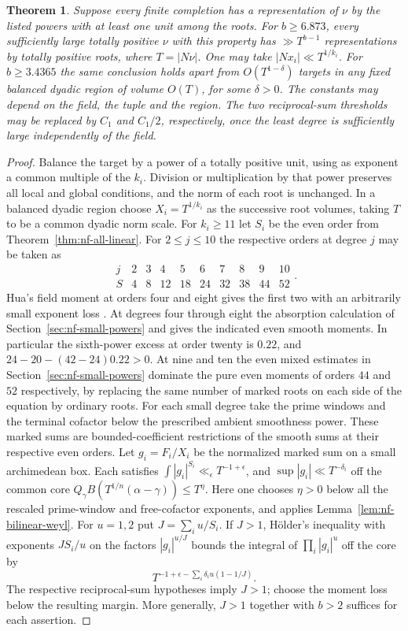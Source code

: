 \documentclass[11pt,letterpaper]{article}
\newtheorem{theorem}{Theorem}[section]
\theoremstyle{definition}
\numberwithin{equation}{section}
\begin{document}
\begin{theorem}\label{thm:nf-mixed}
Suppose every finite completion has a representation of $\nu$ by the
listed powers with at least one unit among the roots. For $b\ge6.873$,
every sufficiently large totally positive $\nu$ with this property
has $\gg T^{b-1}$ representations by totally positive roots,
where $T=|N\nu|$. One may take $|Nx_i|\ll T^{1/k_i}$.
For $b\ge3.4365$ the same conclusion holds apart from
$O(T^{1-\delta})$ targets in any fixed balanced dyadic region of
volume $O(T)$, for some $\delta>0$. The constants may depend on the
field, the tuple and the region. The two
reciprocal-sum thresholds may be replaced by $C_1$ and
$C_1/2$, respectively, once the least degree is sufficiently
large independently of the field.
\end{theorem}
\begin{proof}
Balance the target by a power of a totally positive unit, using as
exponent a common multiple of the $k_i$. Division or multiplication by
that power preserves all local and global conditions, and the norm of
each root is unchanged. In a balanced dyadic region choose $X_i=T^{1/k_i}$
as the successive root volumes, taking $T$ to be a common dyadic norm
scale. For $k_i\ge11$ let $S_i$ be the even order from
Theorem~\ref{thm:nf-all-linear}. For $2\le j\le10$ the respective
orders at degree $j$ may be taken as
\[
  \begin{array}{c|rrrrrrrrr}j&2&3&4&5&6&7&8&9&10\\\hline
                  S&4&8&12&18&24&32&38&44&52\end{array}.
\]
Hua's field moment at orders four and eight gives the first two
with an arbitrarily small exponent loss
\cite[\S3]{NFSmallSupplement}. At degrees four through eight
the absorption calculation of Section~\ref{sec:nf-small-powers}
and \cite[\S\S11--13]{NFSmallSupplement} gives the indicated even
smooth moments. In particular the sixth-power excess at order twenty
is $0.22$, and $24-20-(42-24)0.22>0$. At nine and ten the even
mixed estimates in Section~\ref{sec:nf-small-powers} dominate the
pure even moments of orders $44$ and $52$ respectively, by replacing
the same number of marked roots on each side of the equation by
ordinary roots. For each small degree take the prime windows and
the terminal cofactor below the prescribed ambient smoothness
power. These marked sums are bounded-coefficient restrictions of
the smooth sums at their respective even orders.
Let $g_i=F_i/X_i$ be the normalized marked sum on a small archimedean
box. Each satisfies $\int|g_i|^{S_i}\ll_\epsilon T^{-1+\epsilon}$, and
$\sup|g_i|\ll T^{-\delta_i}$ off the common core
$Q_\gamma B(T^{1/n}(\alpha-\gamma))\le T^\eta$.
Here one chooses $\eta>0$ below all the rescaled prime-window
and free-cofactor exponents, and applies
Lemma~\ref{lem:nf-bilinear-weyl}. For $u=1,2$ put
$J=\sum_i u/S_i$. If $J>1$, H\"older's inequality with exponents
$JS_i/u$ on the factors $|g_i|^{u/J}$ bounds the integral of
$\prod_i|g_i|^u$ off the core by
\[
 T^{-1+\epsilon-\sum_i\delta_i u(1-1/J)}.
\]
The respective reciprocal-sum hypotheses imply $J>1$; choose the moment loss below the resulting margin. More generally, $J>1$ together with $b>2$ suffices for each assertion.


\end{proof}
\end{document}
